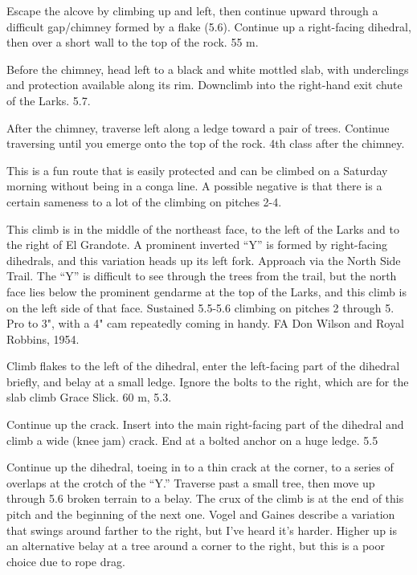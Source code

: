 \documentclass{tahquitz}
\begin{document}
 Escape the alcove by climbing up and left, then continue upward through a
difficult gap/chimney formed by a flake (5.6). Continue up a right-facing dihedral, then
over a short wall to the top
of the rock. 55 m.

 Before the chimney, head left to a black and white mottled slab, with underclings
and protection available along its rim. Downclimb into the right-hand exit chute of the Larks. 5.7.

 After the chimney, traverse left along a ledge toward a pair of trees. Continue
traversing until you emerge onto the top of the rock. 4th class after the chimney.




This is a fun route that is easily protected and
can be climbed on a Saturday morning without being in a conga line. A
possible negative is that there is a certain sameness to a lot of the
climbing on pitches 2-4.

This climb is in the middle of the northeast face, to the left of the
Larks and to the right of El Grandote. A prominent inverted ``Y'' is
formed by right-facing dihedrals, and this variation heads up its
left fork. Approach via the North Side Trail. The ``Y'' is difficult to
see through the trees from the trail, but the north face lies below
the prominent gendarme at the top of the Larks, and this climb is on
the left side of that face. Sustained 5.5-5.6 climbing on pitches 2
through 5. Pro to 3", with  a 4" cam repeatedly coming in handy.
FA Don Wilson and Royal Robbins, 1954.

 Climb flakes to the left of the dihedral, enter the left-facing
part of the dihedral briefly, and belay at a small ledge. Ignore the
bolts to the right, which are for the slab climb Grace Slick. 60 m,
5.3.

 Continue up the crack. Insert into the main right-facing part of
the dihedral and climb a wide (knee jam) crack. End at a bolted
anchor on a huge ledge. 5.5

 Continue up the dihedral, toeing in to a thin crack at the
corner, to a series of overlaps at the crotch of the ``Y.'' Traverse
past a small tree, then move up through 5.6 broken terrain to a
belay. The crux of the climb is at the end of this pitch and the
beginning of the next one. Vogel and Gaines describe a variation that
swings around farther to the right, but I've heard it's harder.
Higher up is an alternative belay at a tree around a corner to the
right, but this is a poor choice due to rope drag.
\end{document}
